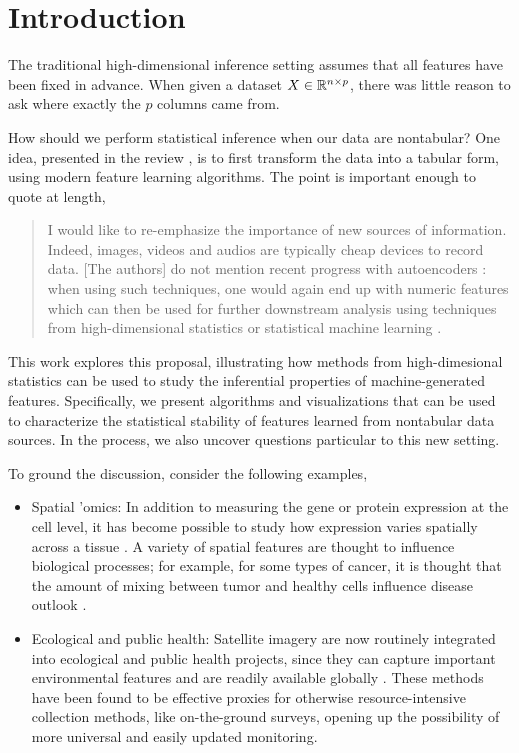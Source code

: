 \section{Introduction}

The traditional high-dimensional inference setting assumes that all features
have been fixed in advance. When given a dataset $X \in \mathbb{R}^{n \times p}$,
there was little reason to ask where exactly the $p$ columns came from. 


How should we perform statistical inference when our data are nontabular? One
idea, presented in the review \citep{buhlmann2019comments}, is to first
transform the data into a tabular form, using modern feature learning
algorithms. The point is important enough to quote at length,

\begin{quote}
I would like to re-emphasize the importance of new sources of information.
Indeed, images, videos and audios are typically cheap devices to record data.
[The authors] do not mention recent progress with autoencoders
\citep{hinton2006reducing, vincent2010stacked}: when using such techniques, one
would again end up with numeric features which can then be used for further
downstream analysis using techniques from high-dimensional statistics or
statistical machine learning \citep{hastie2015statistical,
  buhlmann2011statistics}.
\end{quote}

This work explores this proposal, illustrating how methods from high-dimesional
statistics can be used to study the inferential properties of machine-generated
features. Specifically, we present algorithms and visualizations that can be
used to characterize the statistical stability of features learned from
nontabular data sources. In the process, we also uncover questions particular to
this new setting.

To ground the discussion, consider the following examples,

\begin{itemize}
\item Spatial 'omics: In addition to measuring the gene or protein expression at
  the cell level, it has become possible to study how expression varies
  spatially across a tissue \citep{burgess2019spatial, lundberg2019spatial}. A
  variety of spatial features are thought to influence biological processes; for
  example, for some types of cancer, it is thought that the amount of mixing
  between tumor and healthy cells influence disease outlook
  \citep{keren2018structured}.
\item Ecological and public health: Satellite imagery are now routinely
  integrated into ecological and public health projects, since they can capture
  important environmental features and are readily available globally
  \citep{jean2016combining, wu2020air, bondimapping}. These methods have been found to be effective
  proxies for otherwise resource-intensive collection methods, like
  on-the-ground surveys, opening up the possibility of more universal and easily
  updated monitoring.
\end{itemize}


